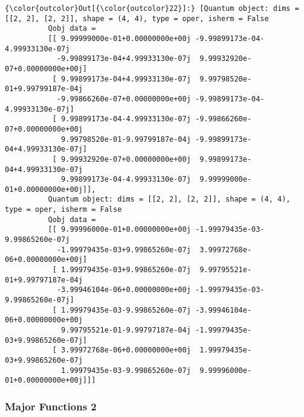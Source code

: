 \documentclass[11pt]{article}
\begin{document}
\begin{Verbatim}[commandchars=\\\{\}]
{\color{outcolor}Out[{\color{outcolor}22}]:} [Quantum object: dims = [[2, 2], [2, 2]], shape = (4, 4), type = oper, isherm = False
          Qobj data =
          [[ 9.99999000e-01+0.00000000e+00j -9.99899173e-04-4.99933130e-07j
            -9.99899173e-04+4.99933130e-07j  9.99932920e-07+0.00000000e+00j]
           [ 9.99899173e-04+4.99933130e-07j  9.99798520e-01+9.99799187e-04j
            -9.99866260e-07+0.00000000e+00j -9.99899173e-04-4.99933130e-07j]
           [ 9.99899173e-04-4.99933130e-07j -9.99866260e-07+0.00000000e+00j
             9.99798520e-01-9.99799187e-04j -9.99899173e-04+4.99933130e-07j]
           [ 9.99932920e-07+0.00000000e+00j  9.99899173e-04+4.99933130e-07j
             9.99899173e-04-4.99933130e-07j  9.99999000e-01+0.00000000e+00j]],
          Quantum object: dims = [[2, 2], [2, 2]], shape = (4, 4), type = oper, isherm = False
          Qobj data =
          [[ 9.99996000e-01+0.00000000e+00j -1.99979435e-03-9.99865260e-07j
            -1.99979435e-03+9.99865260e-07j  3.99972768e-06+0.00000000e+00j]
           [ 1.99979435e-03+9.99865260e-07j  9.99795521e-01+9.99797187e-04j
            -3.99946104e-06+0.00000000e+00j -1.99979435e-03-9.99865260e-07j]
           [ 1.99979435e-03-9.99865260e-07j -3.99946104e-06+0.00000000e+00j
             9.99795521e-01-9.99797187e-04j -1.99979435e-03+9.99865260e-07j]
           [ 3.99972768e-06+0.00000000e+00j  1.99979435e-03+9.99865260e-07j
             1.99979435e-03-9.99865260e-07j  9.99996000e-01+0.00000000e+00j]]]
\end{Verbatim}
            
    \subsubsection{Major Functions 2}\label{major-functions-2}
\end{document}
